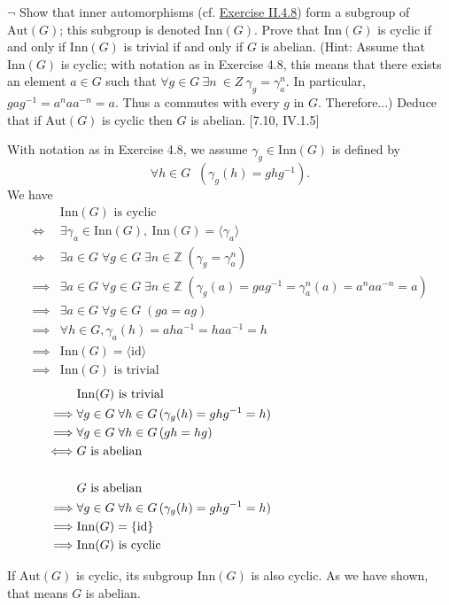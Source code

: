 \documentclass[12pt,letterpaper,boxed]{hmcpset}
\newcommand{\Aut}{\mathrm{Aut}}
\newcommand{\Inn}{\mathrm{Inn}}
\newcommand{\Z}{\mathbb{Z}}
\begin{document}
\hypertarget{Exercise II.6.7}{}
\begin{problem}[6.7]
$\neg$ Show that inner automorphisms (cf. \hyperlink{Exercise II.4.8}{Exercise II.4.8}) form a subgroup of
$\Aut(G)$; this subgroup is denoted $\Inn(G)$. Prove that $\Inn(G)$ is cyclic if and only if $\Inn(G)$ is trivial if and only if $G$ is abelian. (Hint: Assume that $\Inn(G)$ is cyclic; with notation as in Exercise 4.8, this means that there exists an element $a \in G$ such that $\forall g \in  G\ \exists n\ \in Z\ \gamma_g = \gamma^n_a$. In particular, $gag^{-1} = a^naa^{-n} = a$. Thus a commutes with every $g$ in $G$. Therefore...) Deduce that if $\Aut(G)$ is cyclic then $G$ is abelian. [7.10, IV.1.5]
\end{problem}
\begin{solution}
With notation as in Exercise 4.8, we assume $\gamma_g\in \Inn(G)$ is defined by
\[
\forall h\in G\;\;(\gamma_g(h)=ghg^{-1}).
\]
We have
\begin{align*}
	&\Inn(G) \text{ is cyclic} \\
\iff&\exists \gamma_a\in \Inn(G),\ \Inn(G)=\langle\gamma_a\rangle\\
\iff&\exists a\in G\; \forall g\in G\; \exists n\in \Z\;(\gamma_g=\gamma_a^n)\\
\implies&\exists a\in G\; \forall g\in G\; \exists n\in \Z\; (\gamma_g(a)=gag^{-1}=\gamma_a^n(a)=a^naa^{-n} = a)\\
\implies&\exists a\in G\; \forall g\in G\; (ga=ag)\\
\implies&\forall h\in G,\gamma_a(h)=aha^{-1}=haa^{-1}=h\\
\implies&\Inn(G)=\langle \mathrm{id}\rangle\\
\implies&\Inn(G) \text{ is trivial} 
\end{align*}
\begin{align*}
&\Inn(G) \text{ is trivial} \\
\implies&\forall g\in G\;\forall h\in G\,(\gamma_g(h)=ghg^{-1}=h)\hspace{11.5em}\\
\implies&\forall g\in G\;\forall h\in G\,(gh=hg)\\
\iff& G \text{ is abelian}\\
\\
&G \text{ is abelian} \\
\implies&\forall g\in G\;\forall h\in G\,(\gamma_g(h)=ghg^{-1}=h)\\
\implies&\Inn(G)=\{\mathrm{id}\}\\
\implies&\Inn(G) \text{ is cyclic}
\end{align*}

\noindent If $\Aut(G)$ is cyclic, its subgroup $\Inn(G)$ is also cyclic. As we have shown, that means $G$ is abelian. 
\end{solution}
\end{document}
